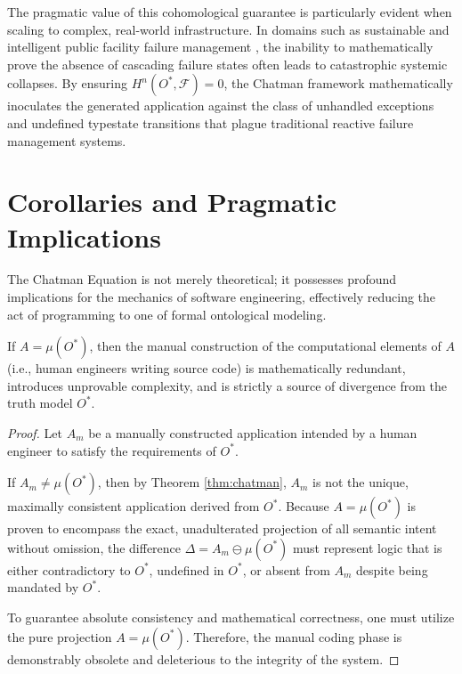 The pragmatic value of this cohomological guarantee is particularly evident when scaling to complex, real-world infrastructure. In domains such as sustainable and intelligent public facility failure management \cite{ref_SustainableandI19}, the inability to mathematically prove the absence of cascading failure states often leads to catastrophic systemic collapses. By ensuring $H^n(O^*, \mathcal{F}) = 0$, the Chatman framework mathematically inoculates the generated application against the class of unhandled exceptions and undefined typestate transitions that plague traditional reactive failure management systems.

\section{Corollaries and Pragmatic Implications}

The Chatman Equation is not merely theoretical; it possesses profound implications for the mechanics of software engineering, effectively reducing the act of programming to one of formal ontological modeling.

\begin{corollary}
\label{cor:zero_code}
If $A = \mu(O^*)$, then the manual construction of the computational elements of $A$ (i.e., human engineers writing source code) is mathematically redundant, introduces unprovable complexity, and is strictly a source of divergence from the truth model $O^*$.
\end{corollary}

\begin{proof}
Let $A_m$ be a manually constructed application intended by a human engineer to satisfy the requirements of $O^*$. 

If $A_m \neq \mu(O^*)$, then by Theorem \ref{thm:chatman}, $A_m$ is not the unique, maximally consistent application derived from $O^*$. Because $A = \mu(O^*)$ is proven to encompass the exact, unadulterated projection of all semantic intent without omission, the difference $\Delta = A_m \ominus \mu(O^*)$ must represent logic that is either contradictory to $O^*$, undefined in $O^*$, or absent from $A_m$ despite being mandated by $O^*$. 

To guarantee absolute consistency and mathematical correctness, one must utilize the pure projection $A = \mu(O^*)$. Therefore, the manual coding phase is demonstrably obsolete and deleterious to the integrity of the system.
\end{proof}

